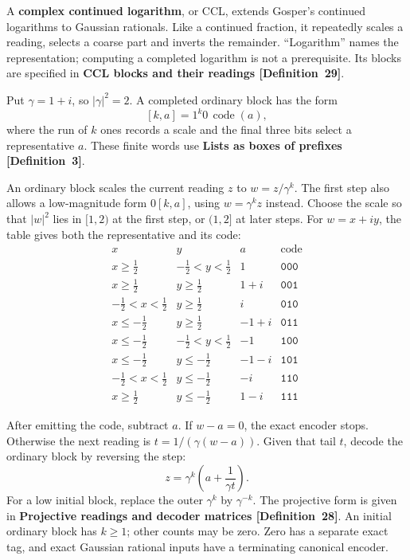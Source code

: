 \documentclass[11pt]{article}
\newcommand{\sq}[1]{\lvert #1\rvert^2}
\newcommand{\entryname}[3]{\textbf{#3 \mbox{[#1~#2]}}}
\begin{document}
A \textbf{complex continued logarithm}, or CCL, extends Gosper's continued
logarithms to Gaussian rationals. Like a continued fraction, it repeatedly
scales a reading, selects a coarse part and inverts the remainder.
``Logarithm'' names the representation; computing a completed logarithm
is not a prerequisite.
Its blocks are specified in \entryname{Definition}{29}{CCL blocks and their readings}.

Put $\gamma=1+i$, so $\sq\gamma=2$. A completed ordinary block has the form
\[
                   [k,a]=1^k0\,\operatorname{code}(a),
\]
where the run of $k$ ones records a scale and the final three bits select
a representative $a$. These finite words use
\entryname{Definition}{3}{Lists as boxes of prefixes}.

\begingroup\samepage
An ordinary block scales the current reading $z$ to $w=z/\gamma^k$.
The first step also allows a low-magnitude form $0[k,a]$, using
$w=\gamma^kz$ instead. Choose the scale so that $\sq w$ lies in $[1,2)$
at the first step, or $(1,2]$ at later steps. For $w=x+iy$, the table gives
both the representative and its code:
\begingroup
\renewcommand{\arraystretch}{1.3}
\[
\begin{array}{c|c|c|c}
x&y&a&\text{code}\\ \hline
x\geq\tfrac12&-\tfrac12<y<\tfrac12&1&\texttt{000}\\
x\geq\tfrac12&y\geq\tfrac12&1+i&\texttt{001}\\
-\tfrac12<x<\tfrac12&y\geq\tfrac12&i&\texttt{010}\\
x\leq-\tfrac12&y\geq\tfrac12&-1+i&\texttt{011}\\
x\leq-\tfrac12&-\tfrac12<y<\tfrac12&-1&\texttt{100}\\
x\leq-\tfrac12&y\leq-\tfrac12&-1-i&\texttt{101}\\
-\tfrac12<x<\tfrac12&y\leq-\tfrac12&-i&\texttt{110}\\
x\geq\tfrac12&y\leq-\tfrac12&1-i&\texttt{111}
\end{array}
\]
\endgroup
\par\endgroup
After emitting the code, subtract $a$. If $w-a=0$, the exact encoder stops.
Otherwise the next reading is $t=1/(\gamma(w-a))$. Given that tail $t$,
decode the ordinary block by reversing the step:
\[
                       z=\gamma^k\left(a+\frac1{\gamma t}\right).
\]
For a low initial block, replace the outer $\gamma^k$ by $\gamma^{-k}$.
The projective form is given in \entryname{Definition}{28}{Projective readings and decoder matrices}.
An initial ordinary block has $k\geq1$; other counts may be zero.
Zero has a separate exact tag, and exact Gaussian rational inputs have a
terminating canonical encoder.
\end{document}
